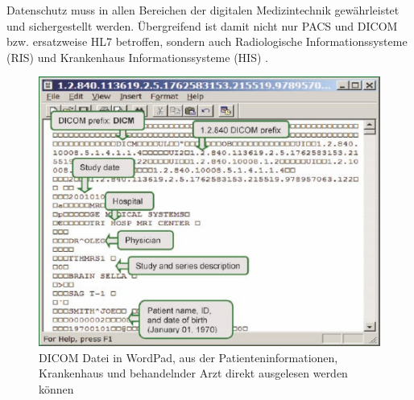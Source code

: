 Datenschutz muss in allen Bereichen der digitalen Medizintechnik gewährleistet und sichergestellt werden. Übergreifend ist damit nicht nur PACS und DICOM bzw. ersatzweise HL7 betroffen, sondern auch Radiologische Informationssysteme (RIS) und Krankenhaus Informationssysteme (HIS) \cite{DICOM}. 

\begin{figure} [H]
	\includegraphics[scale = 0.7]{Content/Pictures/DICOMEditor.png}
	\caption{DICOM Datei in WordPad, aus der Patienteninformationen, Krankenhaus und behandelnder Arzt direkt ausgelesen werden können \cite{DICOM}}
	\label{fig:dicom}
\end{figure}
